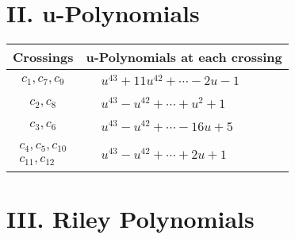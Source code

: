 \documentclass[1p]{elsarticle_modified}
\theoremstyle{definition}
\begin{document}
\newpage\renewcommand{\arraystretch}{1}
\centering \section*{ II. u-Polynomials}
\begin{tabular}{m{50pt}|m{274pt}}
Crossings & \hspace{64pt}u-Polynomials at each crossing \\
\hline $$\begin{aligned}c_{1},c_{7},c_{9}\end{aligned}$$&$\begin{aligned}
&u^{43}+11 u^{42}+\cdots-2 u-1
\end{aligned}$\\
\hline $$\begin{aligned}c_{2},c_{8}\end{aligned}$$&$\begin{aligned}
&u^{43}- u^{42}+\cdots+u^2+1
\end{aligned}$\\
\hline $$\begin{aligned}c_{3},c_{6}\end{aligned}$$&$\begin{aligned}
&u^{43}- u^{42}+\cdots-16 u+5
\end{aligned}$\\
\hline $$\begin{aligned}c_{4},c_{5},c_{10}\\c_{11},c_{12}\end{aligned}$$&$\begin{aligned}
&u^{43}- u^{42}+\cdots+2 u+1
\end{aligned}$\\
\hline
\end{tabular}\newpage\renewcommand{\arraystretch}{1}
\centering \section*{ III. Riley Polynomials}
\end{document}
